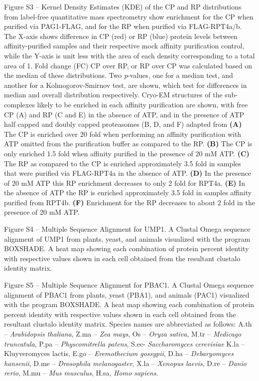 Figure S3 – Kernel Density Estimates (KDE) of the CP and RP distributions from label-free quantitative mass spectrometry show enrichment for the CP when purified via PAG1-FLAG, and for the RP when purified via FLAG-RPT4a/b. The X-axis shows difference in CP (red) or RP (blue) protein levels between affinity-purified samples and their respective mock affinity purification control, while the Y-axis is unit less with the area of each density corresponding to a total area of 1. Fold change (FC) CP over RP, or RP over CP was calculated based on the median of these distributions. Two \textit{p}-values, one for a median test, and another for a Kolmogorov-Smirnov test, are shown, which test for differences in median and overall distribution respectively. Cryo-EM structures of the sub-complexes likely to be enriched in each affinity purification are shown, with free CP (A) and RP (C and E) in the absence of ATP, and in the presence of ATP half capped and doubly capped proteasomes (B, D, and F) adapted from \citep{beck12} \textbf{(A)} The CP is enriched over 20 fold when performing an affinity purification with ATP omitted from the purification buffer as compared to the RP. \textbf{(B)} The CP is only enriched 1.5 fold when affinity purified in the presence of 20 mM ATP. \textbf{(C)} The RP as compared to the CP is enriched approximately 3.5 fold in samples that were purified via FLAG-RPT4a in the absence of ATP. \textbf{(D)} In the presence of 20 mM ATP this RP enrichment decreases to only 2 fold for RPT4a. \textbf{(E)} In the absence of ATP the RP is enriched approximately 3.5 fold in samples affinity purified from RPT4b. \textbf{(F)} Enrichment for the RP decreases to about 2 fold in the presence of 20 mM ATP.


Figure S4 – Multiple Sequence Alignment for UMP1. A Clustal Omega \citep{sievers14} sequence alignment of UMP1 from plants, yeast, and animals visualized with the program BOXSHADE. A heat map showing each combination of protein percent identity with respective values shown in each cell obtained from the resultant clustalo identity matrix. 

Figure S5 – Multiple Sequence Alignment for PBAC1. A Clustal Omega \citep{sievers14} sequence alignment of PBAC1 from plants, yeast (PBA1), and animals (PAC1) visualized with the program BOXSHADE. A heat map showing each combination of protein percent identity with respective values shown in each cell obtained from the resultant clustalo identity matrix. Species names are abbreviated as follows: A.th – \textit{Arabidopsis thaliana}, Z.ma – \textit{Zea mays}, Os – \textit{Oryza sativa}, M.tr – \textit{Medicago truncatula}, P.pa – \textit{Physcomitrella patens}, S.ec- \textit{Saccharomyces cerevisiae} K.la – {Kluyveromyces lactis}, E.go – \textit{Eremothecium gossypii}, D.ha – \textit{Debaryomyces hansenii}, D.me – \textit{Drosophila melanogaster}, X.la – \textit{Xenopus laevis}, D.re – \textit{Danio rerio}, M.mu – \textit{Mus musculus}, H.sa, \textit{Homo sapiens}.


